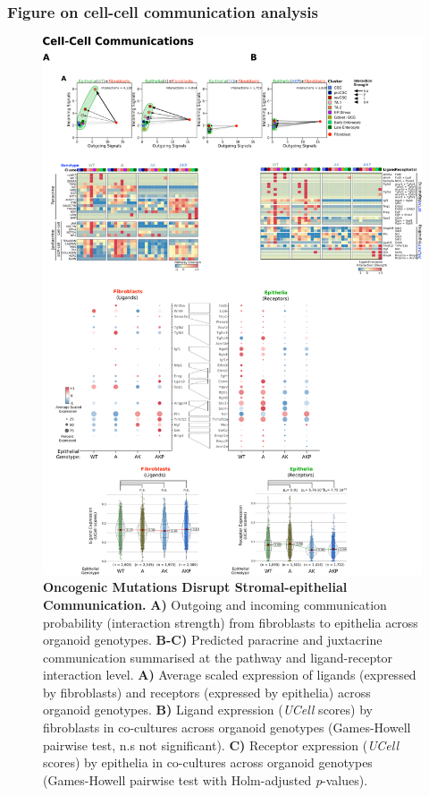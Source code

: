 \subsubsection{Figure on cell-cell communication analysis}

\begin{figure}
    \centering
    \includegraphics{04seq/figs/4SEQ_CC.png}
    \caption{\textbf{Oncogenic Mutations Disrupt Stromal-epithelial Communication.} \textbf{A)} Outgoing and incoming communication probability (interaction strength) from fibroblasts to epithelia across organoid genotypes. \textbf{B-C)} Predicted paracrine and juxtacrine communication summarised at the pathway and ligand-receptor interaction level. \textbf{A)} Average scaled expression of ligands (expressed by fibroblasts) and receptors (expressed by epithelia) across organoid genotypes. \textbf{B)} Ligand expression (\textit{UCell} scores) by fibroblasts in co-cultures across organoid genotypes (Games-Howell pairwise test, n.s not significant). \textbf{C)} Receptor expression (\textit{UCell} scores) by epithelia in co-cultures across organoid genotypes (Games-Howell pairwise test with Holm-adjusted \textit{p}-values).}
    \label{fig:}
\end{figure}

